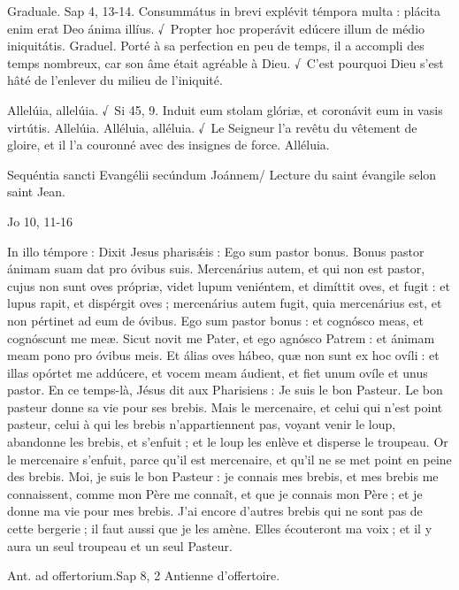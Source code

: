 \begin{paracol}{2}
Graduale. Sap 4, 13-14. Consummátus in brevi explévit témpora multa : plácita enim erat Deo ánima illíus. √~Propter hoc properávit edúcere illum de médio iniquitátis.
\switchcolumn
Graduel. Porté à sa perfection en peu de temps, il a accompli des temps nombreux, car son âme était agréable à Dieu. √~C’est pourquoi Dieu s’est hâté de l’enlever du milieu de l’iniquité.
\switchcolumn*

Allelúia, allelúia. √~Si 45, 9. Induit eum stolam glóriæ, et coronávit eum in vasis virtútis. Allelúia.
\switchcolumn
Alléluia, alléluia. √~Le Seigneur l’a revêtu du vêtement de gloire, et il l’a couronné avec des insignes de force. Alléluia.
\switchcolumn*

Sequéntia sancti Evangélii secúndum Joánnem/
\switchcolumn
Lecture du saint évangile selon saint Jean.
\switchcolumn*

Jo 10, 11-16
\switchcolumn

\switchcolumn*

In illo témpore : Dixit Jesus pharisǽis :  Ego sum pastor bonus. Bonus pastor ánimam suam dat pro óvibus suis. Mercenárius autem, et qui non est pastor, cujus non sunt oves própriæ, videt lupum veniéntem, et dimíttit oves, et fugit : et lupus rapit, et dispérgit oves ; mercenárius autem fugit, quia mercenárius est, et non pértinet ad eum de óvibus. Ego sum pastor bonus : et cognósco meas, et cognóscunt me meæ. Sicut novit me Pater, et ego agnósco Patrem : et ánimam meam pono pro óvibus meis. Et álias oves hábeo, quæ non sunt ex hoc ovíli : et illas opórtet me addúcere, et vocem meam áudient, et fiet unum ovíle et unus pastor.
\switchcolumn
En ce temps-là, Jésus dit aux Pharisiens :  Je suis le bon Pasteur. Le bon pasteur donne sa vie pour ses brebis. Mais le mercenaire, et celui qui n’est point pasteur, celui à qui les brebis n’appartiennent pas, voyant venir le loup, abandonne les brebis, et s’enfuit ; et le loup les enlève et disperse le troupeau. Or le mercenaire s’enfuit, parce qu’il est mercenaire, et qu’il ne se met point en peine des brebis. Moi, je suis le bon Pasteur : je connais mes brebis, et mes brebis me connaissent, comme mon Père me connaît, et que je connais mon Père ; et je donne ma vie pour mes brebis. J’ai encore d’autres brebis qui ne sont pas de cette bergerie ; il faut aussi que je les amène. Elles écouteront ma voix ; et il y aura un seul troupeau et un seul Pasteur.
\switchcolumn*

Ant. ad offertorium.\hfill Sap 8, 2
\switchcolumn
Antienne d’offertoire.
\switchcolumn*


\end{paracol}
